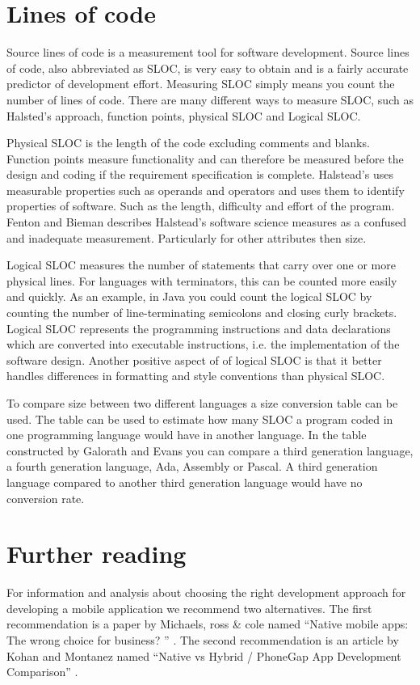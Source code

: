 \section{Lines of code}\label{sec:lines-of-code}
Source lines of code is a measurement tool for software development. Source lines of code, also abbreviated as SLOC, is very easy to obtain and is a fairly accurate predictor of development effort\cite[p.~63]{galorath2006}. Measuring SLOC simply means you count the number of lines of code. There are many different ways to measure SLOC, such as Halsted’s approach, function points, physical SLOC and Logical SLOC. 

Physical SLOC is the length of the code excluding comments and blanks. Function points measure functionality and can therefore be measured before the design and coding if the requirement specification is complete\cite[p.~187]{galorath2006}. Halstead’s uses measurable properties such as operands and operators and uses them to identify properties of software. Such as the length, difficulty and effort of the program. Fenton and Bieman describes Halstead’s software science measures as a confused and inadequate measurement. Particularly for other attributes then size\cite[p.~345]{fenton2015}.

Logical SLOC measures the number of statements that carry over one or more physical lines.  For languages with terminators, this can be counted more easily and quickly. As an example, in Java you could count the logical SLOC by counting the number of line-terminating semicolons and closing curly brackets. Logical SLOC represents the programming instructions and data declarations which are converted into executable instructions, i.e. the implementation of the software design. Another positive aspect of of logical SLOC is that it better handles differences in formatting and style conventions than physical SLOC\cite[p.~155]{galorath2006}.

To compare size between two different languages a size conversion table can be used. The table can be used to estimate how many SLOC a program coded in one programming language would have in another language. In the table constructed by Galorath and Evans you can compare a third generation language, a fourth generation language, Ada, Assembly or Pascal\cite[p.~163]{galorath2006}. A third generation language compared to another third generation language would have no conversion rate. 

\section{Further reading}\label{sec:further-reading}
For information and analysis about choosing the right development approach for developing a mobile application we recommend two alternatives. The first recommendation is a paper by Michaels, ross \& cole named “Native mobile apps: The wrong choice for business? ” \cite{michaels2013}. The second recommendation is an article by Kohan and Montanez named “Native vs Hybrid / PhoneGap App Development Comparison” \cite{kohan2015}. 


